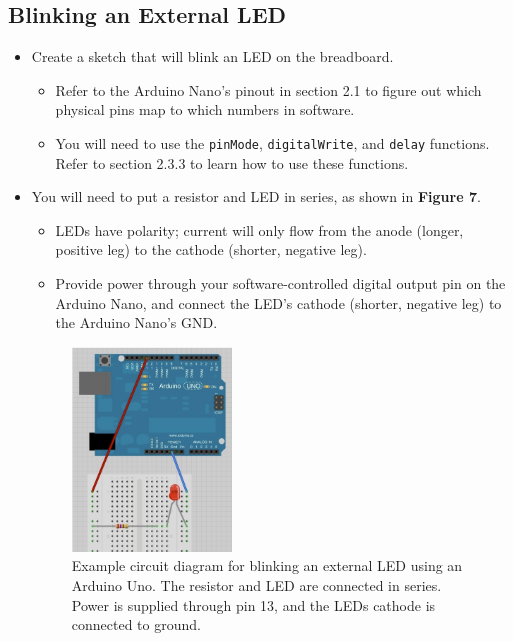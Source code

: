 \documentclass{article}
\begin{document}
\subsection{Blinking an External LED}
\begin{itemize}
    \item Create a sketch that will blink an LED on the breadboard.
    \begin{itemize}
        \item Refer to the Arduino Nano's pinout in section 2.1 to figure out which physical pins map to which numbers in software.
        \item You will need to use the \verb|pinMode|, \verb|digitalWrite|, and \verb|delay| functions. Refer to section 2.3.3 to learn how to use these functions.
    \end{itemize}
    \item You will need to put a resistor and LED in series, as shown in {\bf Figure 7}.
    \begin{itemize}
        \item LEDs have polarity; current will only flow from the anode (longer, positive leg) to the cathode (shorter, negative leg).
        \item Provide power through your software-controlled digital output pin on the Arduino Nano, and connect the LED's cathode (shorter, negative leg) to the Arduino Nano's GND. 
    \end{itemize}

    \begin{figure}[ht]
        \centering
        \includegraphics[width = 0.4\textwidth]{images/blinkLEDcircuit.png}
        \cprotect\caption{Example circuit diagram for blinking an external LED using an Arduino Uno. The resistor and LED are connected in series. Power is supplied through pin 13, and the LEDs cathode is connected to ground.}
    \end{figure}
    
\end{itemize}
\end{document}
